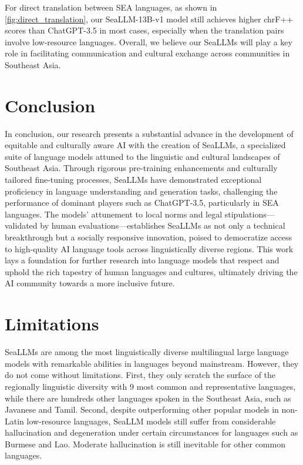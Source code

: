 For direct translation between SEA languages, as shown in \ref{fig:direct_translation}, our SeaLLM-13B-v1 model still achieves higher chrF++ scores than ChatGPT-3.5 in most cases, especially when the translation pairs involve low-resource languages. Overall, we believe our SeaLLMs will play a key role in facilitating communication and cultural exchange across communities in Southeast Asia.

\section{Conclusion}
In conclusion, our research presents a substantial advance in the development of equitable and culturally aware AI with the creation of SeaLLMs, a specialized suite of language models attuned to the linguistic and cultural landscapes of Southeast Asia. Through rigorous pre-training enhancements and culturally tailored fine-tuning processes, SeaLLMs have demonstrated exceptional proficiency in language understanding and generation tasks, challenging the performance of dominant players such as ChatGPT-3.5, particularly in SEA languages. The models' attunement to local norms and legal stipulations—validated by human evaluations—establishes SeaLLMs as not only a technical breakthrough but a socially responsive innovation, poised to democratize access to high-quality AI language tools across linguistically diverse regions. This work lays a foundation for further research into language models that respect and uphold the rich tapestry of human languages and cultures, ultimately driving the AI community towards a more inclusive future.

\section{Limitations}

SeaLLMs are among the most linguistically diverse multilingual large language models with remarkable abilities in languages beyond mainstream. However, they do not come without limitations. First, they only scratch the surface of the regionally linguistic diversity with 9 most common and representative languages, while there are hundreds other languages spoken in the Southeast Asia, such as Javanese and Tamil. Second, despite outperforming other popular models in non-Latin low-resource languages, SeaLLM models still suffer from considerable hallucination and degeneration under certain circumstances for languages such as Burmese and Lao. Moderate hallucination is still inevitable for other common languages.


